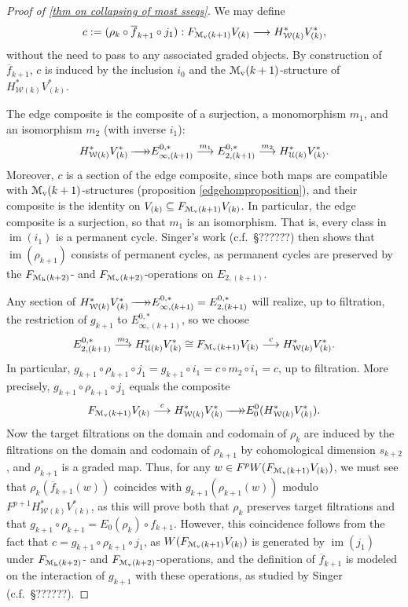 \documentclass[11pt]{amsart}
\theoremstyle{plain}
\theoremstyle{definition}
\DeclareMathOperator{\im}{im}
\renewcommand{\to}{\longrightarrow}
\newcommand{\calW}{\mathcal{W}}
\newcommand{\calU}{\mathcal{U}}
\newcommand{\calMv}{\mathcal{M}_\textup{v}}
\newcommand{\calMh}{\mathcal{M}_\textup{h}}
\theoremstyle{plain}
\newcommand{\epi}{{\,\makebox[0cm][l]{\ensuremath\to}\to}}
\begin{document}
\begin{Calculations of HWn for n nonzero}
\begin{proof}[Proof of \ref{thm on collapsing of most sseqs}]
 We may define 
\[c:=(\rho_k\circ \overline{f}_{k+1}\circ j_1):F_{\calMv(k+1)}V_{(k)}\to H^*_{\calW(k)}V^*_{(k)},\]
without the need to pass to any associated graded objects. By construction of $\overline{f}_{k+1}$,  $c$ is induced by the inclusion $i_0$ and the $\calMv(k+1)$-structure of $H^*_{\calW(k)}V^*_{(k)}$.

The edge composite is the composite of a surjection, a monomorphism $m_1$, and an isomorphism $m_2$ (with inverse $i_1$):
\[H^*_{\calW(k)}V^*_{(k)}\epi E_{\infty,(k+1)}^{0,*}\overset{m_1}{\to}E_{2,(k+1)}^{0,*}\overset{m_2}{\to}H^*_{\calU(k)}V^*_{(k)}.\]
Moreover, $c$ is a section of the edge composite, since both maps are compatible with $\calMv(k+1)$-structures (proposition \ref{edgehomproposition}), and their composite is the identity on $V_{(k)}\subseteq  F_{\calMv(k+1)}V_{(k)}$.
In particular, the edge composite is a surjection, so that $m_{1}$ is an isomorphism. That is, every class in $\im(i_1)$ is a permanent cycle. Singer's work (c.f.\ \S??????) then shows that $\im(\rho_{k+1})$ consists of permanent cycles, as permanent cycles are preserved by the $F_{\calMh(k+2)}$- and $F_{\calMv(k+2)}$-operations on $E_{2,(k+1)}$.


Any section of $H^*_{\calW(k)}V^*_{(k)}\epi E_{\infty,(k+1)}^{0,*}=E_{2,(k+1)}^{0,*}$ will realize, up to filtration, the restriction of $g_{k+1}$ to $E_{\infty,(k+1)}^{0,*}$, so we choose
\[E_{2,(k+1)}^{0,*}\overset{m_2}{\to} H^*_{\calU(k)}V^*_{(k)}\cong F_{\calMv(k+1)}V_{(k)}\overset{c}{\to}H^*_{\calW(k)}V^*_{(k)}.\]
In particular, $g_{k+1}\circ \rho_{k+1}\circ j_1=g_{k+1}\circ i_1=c\circ m_2\circ i_1=c$, up to filtration. More precisely, $g_{k+1}\circ \rho_{k+1}\circ j_1$ equals the composite
\begin{gather*}
F_{\calMv(k+1)}V_{(k)}\overset{c}{\to} H^*_{\calW(k)}V^*_{(k)}\epi E_0^0(H^*_{\calW(k)}V^*_{(k)}).
\end{gather*}
Now the target filtrations on the domain and codomain of $\rho_k$ are induced by the filtrations on the domain and codomain of $\rho_{k+1}$ by cohomological dimension $s_{k+2}$, and $\rho_{k+1}$ is a graded map. Thus, for any $w\in F^pW(F_{\calMv(k+1)}V_{(k)})$, we must see that $\rho_k(\overline{f}_{k+1}(w))$ coincides with $g_{k+1}(\rho_{k+1}(w))$ modulo $F^{p+1}H^*_{\calW(k)}V^*_{(k)}$, as this will prove both that $\rho_k$ preserves target filtrations and that  $g_{k+1}\circ \rho_{k+1}=E_0(\rho_{k})\circ f_{k+1}$. However, this coincidence follows from the fact that $c=g_{k+1}\circ \rho_{k+1}\circ j_1$, as $W(F_{\calMv(k+1)}V_{(k)})$ is generated by $\im(j_1)$ under $F_{\calMh(k+2)}$- and $F_{\calMv(k+2)}$-operations, and the definition of $\overline{f}_{k+1}$ is modeled on the interaction of $g_{k+1}$ with these operations, as studied by Singer (c.f.\ \S??????).


\end{proof}
\end{Calculations of HWn for n nonzero}
\end{document}
